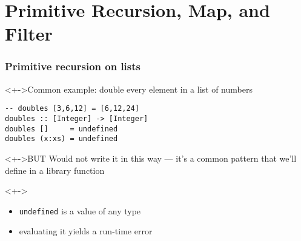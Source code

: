 \documentclass{beamer}
\begin{document}
\section{Primitive Recursion, Map, and Filter}
\begin{frame}[fragile]
  \frametitle{Primitive recursion on lists}
  \begin{block}<+->{Common example: double every element in a list of numbers}
\begin{lstlisting}
-- doubles [3,6,12] = [6,12,24]
doubles :: [Integer] -> [Integer]
doubles []     = undefined
doubles (x:xs) = undefined
\end{lstlisting}
  \end{block}
  \begin{alertblock}<+->{BUT}
    Would not write it in this way --- it's a common pattern that we'll define in a library function 
  \end{alertblock}
  \begin{alertblock}<+->{}
    \begin{itemize}
    \item \lstinline{undefined} is a value of any type
    \item evaluating it yields a run-time error
    \end{itemize}
  \end{alertblock}
\end{frame}
\end{document}
